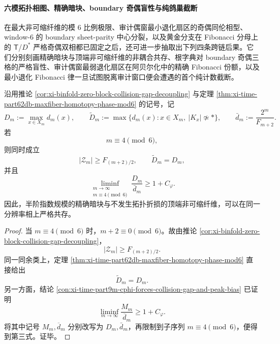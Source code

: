 \paragraph{六模拓扑相图、精确暗块、boundary 奇偶盲性与纯鸽巢截断}
在最大非可缩纤维的模 \(6\) 比例极限、审计偶窗最小退化扇区的奇偶同伦相型、window-\(6\) 的 boundary sheet-parity 中心分裂，以及黄金分支在 Fibonacci 分母上的 \(\mathsf T\)/\(D^\ast\) 严格奇偶双相都已固定之后，还可进一步抽取出下列四条跨链后果。它们分别刻画精确暗块与顶端非可缩纤维的非耦合共存、根字典对 boundary 奇偶三格的严格盲性、审计偶窗最弱退化扇区在阿贝尔化中的精确 Fibonacci 份额，以及最小退化 Fibonacci 律一旦试图脱离审计窗口便会遭遇的首个纯计数截断。

\begin{corollary}[精确暗块与拓扑主纤维的非耦合共存]\label{cor:xi-time-part69c-darkblock-topfiber-decoupling}
沿用推论 \ref{cor:xi-binfold-zero-block-collision-gap-decoupling} 与定理 \ref{thm:xi-time-part62db-maxfiber-homotopy-phase-mod6} 的记号，记
\[
D_m:=\max_{x\in X_m}d_m(x),
\qquad
\widetilde D_m:=\max\{d_m(x):x\in X_m,\ |K_x|\not\simeq *\},
\qquad
\bar d_m:=\frac{2^m}{F_{m+2}}.
\]
若
\[
m\equiv 4\pmod 6,
\]
则同时成立
\[
|\mathcal Z_m|\ge F_{(m+2)/2},
\qquad
\widetilde D_m=D_m,
\]
并且
\[
\liminf_{\substack{m\to\infty\\ m\equiv 4\!\!\!\!\pmod 6}}
\frac{D_m}{\bar d_m}
\ge
1+C_\varphi.
\]
因此，半阶指数规模的精确暗块与不发生拓扑折损的顶端非可缩纤维，可以在同一分辨率相上严格共存。
\end{corollary}
\begin{proof}
当 \(m\equiv 4\pmod 6\) 时，\(m+2\equiv 0\pmod 6\)。故由推论 \ref{cor:xi-binfold-zero-block-collision-gap-decoupling}，
\[
|\mathcal Z_m|\ge F_{(m+2)/2}.
\]
同一同余类上，定理 \ref{thm:xi-time-part62db-maxfiber-homotopy-phase-mod6} 直接给出
\[
\widetilde D_m=D_m.
\]
另一方面，结论 \ref{con:xi-time-part9m-cphi-forces-collision-gap-and-peak-bias} 已证明
\[
\liminf_{m\to\infty}\frac{M_m}{\overline d_m}\ge 1+C_\varphi.
\]
将其中记号 \(M_m,\overline d_m\) 分别改写为 \(D_m,\bar d_m\)，再限制到子序列 \(m\equiv 4\pmod 6\)，便得到第三式。证毕。
\end{proof}

